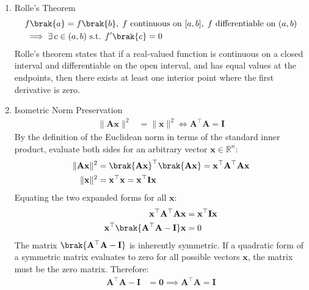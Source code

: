\begin{enumerate}[label=\thesubsection.\arabic*, ref=\thesubsection.\theenumi]
	\item Rolle's Theorem
	\begin{align}
		\begin{split}
			&f\brak{a} = f\brak{b}, \; f \text{ continuous on } [a, b], \; f \text{ differentiable on } (a, b) \\
			&\implies \exists \, c \in (a, b) \text{ s.t. } f'\brak{c} = 0
		\end{split} \label{eq:DA2025-rolles}
	\end{align}
	Rolle's theorem states that if a real-valued function is continuous on a closed interval and differentiable on the open interval, and has equal values at the endpoints, then there exists at least one interior point where the first derivative is zero.
	
	\item Isometric Norm Preservation
	\begin{align}
		\|\mathbf{Ax}\|^2 &= \|\mathbf{x}\|^2 \iff \mathbf{A}^\top\mathbf{A} = \mathbf{I} \label{eq:DA2025-isometric_norm}
	\end{align}
	\solution
	By the definition of the Euclidean norm in terms of the standard inner product, evaluate both sides for an arbitrary vector $\mathbf{x} \in \mathbb{R}^n$:
	\begin{align}
		\|\mathbf{Ax}\|^2 &= \brak{\mathbf{Ax}}^\top \brak{\mathbf{Ax}} = \mathbf{x}^\top \mathbf{A}^\top \mathbf{A} \mathbf{x}
		\\
		\|\mathbf{x}\|^2 &= \mathbf{x}^\top \mathbf{x} = \mathbf{x}^\top \mathbf{I} \mathbf{x}
	\end{align}
	Equating the two expanded forms for all $\mathbf{x}$:
	\begin{align}
		\mathbf{x}^\top \mathbf{A}^\top \mathbf{A} \mathbf{x} &= \mathbf{x}^\top \mathbf{I} \mathbf{x}
		\\
		\mathbf{x}^\top \brak{\mathbf{A}^\top \mathbf{A} - \mathbf{I}} \mathbf{x} &= 0
	\end{align}
	The matrix $\brak{\mathbf{A}^\top \mathbf{A} - \mathbf{I}}$ is inherently symmetric. If a quadratic form of a symmetric matrix evaluates to zero for all possible vectors $\mathbf{x}$, the matrix must be the zero matrix. Therefore:
	\begin{align}
		\mathbf{A}^\top \mathbf{A} - \mathbf{I} &= \mathbf{0} \implies \mathbf{A}^\top \mathbf{A} = \mathbf{I}
	\end{align}
	

\end{enumerate}
